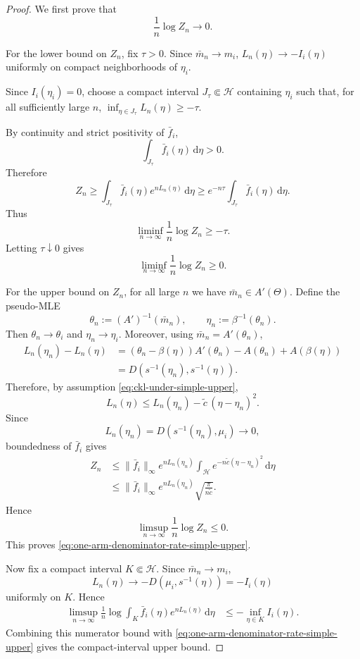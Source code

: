 \documentclass[10pt,a4paper]{amsart}
\newcommand{\dd}{\mathrm{d}}
\begin{document}
\begin{proof}
We first prove that
\begin{equation}
\label{eq:one-arm-denominator-rate-simple-upper}
    \frac1n\log Z_n\to0.
\end{equation}

For the lower bound on \(Z_n\), fix \(\tau>0\).  Since $\bar m_n\to m_i$, $L_n(\eta)\to -I_i(\eta)$ uniformly on compact neighborhoods of \(\eta_i\).  

Since \(I_i(\eta_i)=0\), choose a compact interval \(J_\tau\Subset\mathcal H\) containing \(\eta_i\) such that, for
all sufficiently large \(n\), $\inf_{\eta\in J_\tau}L_n(\eta)\ge -\tau$.

By continuity and strict positivity of \(\bar f_i\),
\[
    \int_{J_\tau}\bar f_i(\eta)\,\dd\eta>0.
\]
Therefore
\[
    Z_n
    \ge
    \int_{J_\tau}\bar f_i(\eta)e^{nL_n(\eta)}\,\dd\eta
    \ge
    e^{-n\tau}\int_{J_\tau}\bar f_i(\eta)\,\dd\eta.
\]
Thus
\[
    \liminf_{n\to\infty}\frac1n\log Z_n\ge -\tau.
\]
Letting \(\tau\downarrow0\) gives
\[
    \liminf_{n\to\infty}\frac1n\log Z_n\ge0.
\]

For the upper bound on \(Z_n\), for all large \(n\) we have
\(\bar m_n\in A'(\Theta)\).  Define the pseudo-MLE
\[
    \theta_n:=(A')^{-1}(\bar m_n),
    \qquad
    \eta_n:=\beta^{-1}(\theta_n).
\]
Then $\theta_n\to\theta_i$ and $\eta_n\to \eta_i$.
Moreover, using \(\bar m_n=A'(\theta_n)\),
\[
\begin{aligned}
    L_n(\eta_n)-L_n(\eta)
    &=
    (\theta_n-\beta(\eta))A'(\theta_n)
    -
    A(\theta_n)
    +
    A(\beta(\eta))                                                \\
    &=
    D(s^{-1}(\eta_n),s^{-1}(\eta)).
\end{aligned}
\]
Therefore, by assumption \eqref{eq:ckl-under-simple-upper},
\[
    L_n(\eta)
    \le
    L_n(\eta_n)-\widetilde{c}\,(\eta-\eta_n)^2.
\]
Since
\[
    L_n(\eta_n)
    =
    D(s^{-1}(\eta_n),\mu_i)
    \to0,
\]
boundedness of \(\bar f_i\) gives
\[
\begin{aligned}
    Z_n
    &\le
    \|\bar f_i\|_\infty
    e^{nL_n(\eta_n)}
    \int_{\mathcal H}e^{-n\widetilde{c} (\eta-\eta_n)^2}\,\dd\eta        \\
    &\le
    \|\bar f_i\|_\infty
    e^{nL_n(\eta_n)}
    \sqrt{\frac{\pi}{n\widetilde{c}}}.
\end{aligned}
\]
Hence
\[
    \limsup_{n\to\infty}\frac1n\log Z_n\le0.
\]
This proves \eqref{eq:one-arm-denominator-rate-simple-upper}.

Now fix a compact interval \(K\Subset\mathcal H\).  Since \(\bar m_n\to m_i\),
\[
    L_n(\eta)\to -D(\mu_i,s^{-1}(\eta))=-I_i(\eta)
\]
uniformly on \(K\).  Hence
\[
\begin{aligned}
    \limsup_{n\to\infty}
    \frac1n\log
    \int_K \bar f_i(\eta)e^{nL_n(\eta)}\,\dd\eta
    &\le
    -\inf_{\eta\in K}I_i(\eta).
\end{aligned}
\]
Combining this numerator bound with
\eqref{eq:one-arm-denominator-rate-simple-upper} gives the compact-interval
upper bound.


\end{proof}
\end{document}
